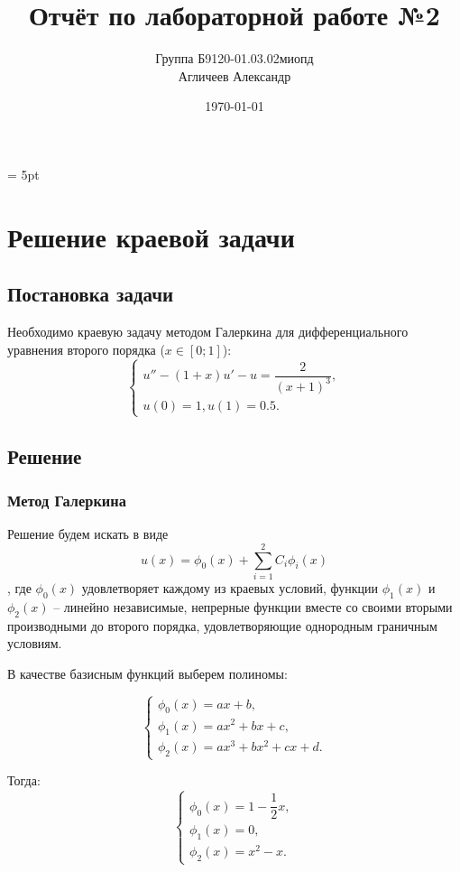 \documentclass[a4paper, 14pt, fleqn]{extarticle}
\author {
	Группа Б9120-01.03.02миопд\\
	Агличеев Александр
}
\title {
	Отчёт по лабораторной работе №2
}
\date {
	\today
}
\begin{document}
	\maketitle
	\pagebreak
	\parskip = 5pt

	\section{Решение краевой задачи}
		\subsection{Постановка задачи}
			\noindent Необходимо краевую задачу методом Галеркина для дифференциального
			уравнения второго порядка ($x \in [0;1]$):
			\begin{equation*}
				\begin{cases}
					u'' - (1+x)u' - u = \dfrac{2}{(x+1)^3},
					\\
					u(0) = 1,
					u(1) = 0.5. 
				\end{cases}
			\end{equation*}
	
		\subsection{Решение}
			
			\subsubsection{Метод Галеркина}
			
				Решение будем искать в виде 
				\[ u(x) = \phi_0(x) + \sum_{i=1}^{2}C_i \phi_i(x) \]
				, где $\phi_0(x)$ удовлетворяет каждому из краевых условий, функции $\phi_1(x)$ и $\phi_2(x)$ -- линейно независимые, непрерные функции вместе со своими вторыми производными до второго порядка, удовлетворяющие однородным граничным условиям.
				
				В качестве базисным функций выберем полиномы:
				
				\begin{equation*}
					\begin{cases}
						\phi_0(x) = ax+b, \\
						\phi_1(x) = ax^2 + bx + c, \\
						\phi_2(x) = ax^3 + bx^2 + cx + d.
					\end{cases}
				\end{equation*}
				
				Тогда:
				\begin{equation*}
					\begin{cases}
						\phi_0(x) = 1 - \dfrac{1}{2}x , \\
						\phi_1(x) = 0, \\
						\phi_2(x) = x^2-x.
					\end{cases}
				\end{equation*}
			
\end{document}
